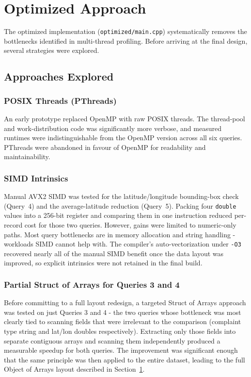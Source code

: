 \documentclass[12pt]{article}
\begin{document}
\section{Optimized Approach}
\label{sec:opt}

The optimized implementation (\texttt{optimized/main.cpp}) systematically
removes the bottlenecks identified in multi-thread profiling. Before arriving
at the final design, several strategies were explored.

\subsection{Approaches Explored}

\subsubsection{POSIX Threads (PThreads)}

An early prototype replaced OpenMP with raw POSIX threads. The thread-pool
and work-distribution code was significantly more verbose, and measured
runtimes were indistinguishable from the OpenMP version across all six queries.
PThreads were abandoned in favour of OpenMP for readability and maintainability.

\subsubsection{SIMD Intrinsics}

Manual AVX2 SIMD was tested for the latitude/longitude bounding-box check
(Query~4) and the average-latitude reduction (Query~5). Packing four
\texttt{double} values into a 256-bit register and comparing them in one
instruction reduced per-record cost for those two queries. However, gains
were limited to numeric-only paths. Most query bottlenecks are in memory
allocation and string handling - workloads SIMD cannot help with. The
compiler's auto-vectorization under \texttt{-O3} recovered nearly all of the
manual SIMD benefit once the data layout was improved, so explicit intrinsics
were not retained in the final build.

\subsubsection{Partial Struct of Arrays for Queries 3 and 4}

Before committing to a full layout redesign, a targeted Struct of Arrays
approach was tested on just Queries 3 and 4 - the two queries whose
bottleneck was most clearly tied to scanning fields that were irrelevant to
the comparison (complaint type string and lat/lon doubles respectively).
Extracting only those fields into separate contiguous arrays and scanning them
independently produced a measurable speedup for both queries.
The improvement was significant enough that the same principle was then applied
to the entire dataset, leading to the full Object of Arrays layout described
in Section~\ref{sec:opt}.
\end{document}
